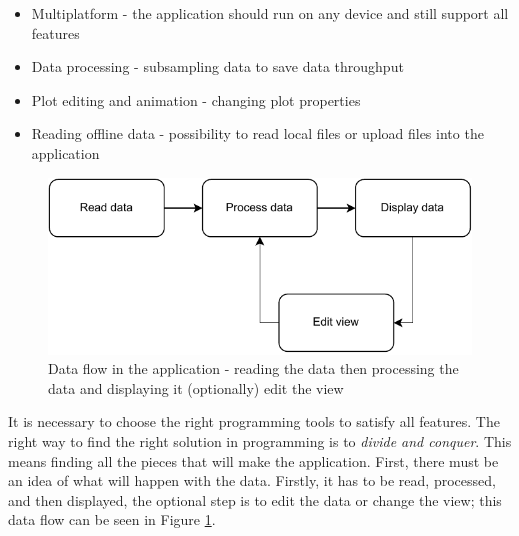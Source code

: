 \begin{itemize}
    \item Multiplatform - the application should run on any device and still support all features
    \item Data processing - subsampling data to save data throughput
    \item Plot editing and animation - changing plot properties
    \item Reading offline data - possibility to read local files or upload files into the application
\end{itemize}


\begin{figure}[h]
    \centering
    \includegraphics{pdf/simple_application.drawio.pdf}
    \caption{Data flow in the application - reading the data then processing the data and displaying it (optionally) edit the view}
    \label{fig:dataflow}
\end{figure}

It is necessary to choose the right programming tools to satisfy all features. The right way to find the right solution in programming is to \textit{divide and conquer}. This means finding all the pieces that will make the application. First, there must be an idea of what will happen with the data. Firstly, it has to be read, processed, and then displayed, the optional step is to edit the data or change the view; this data flow can be seen in Figure \ref{fig:dataflow}. 


